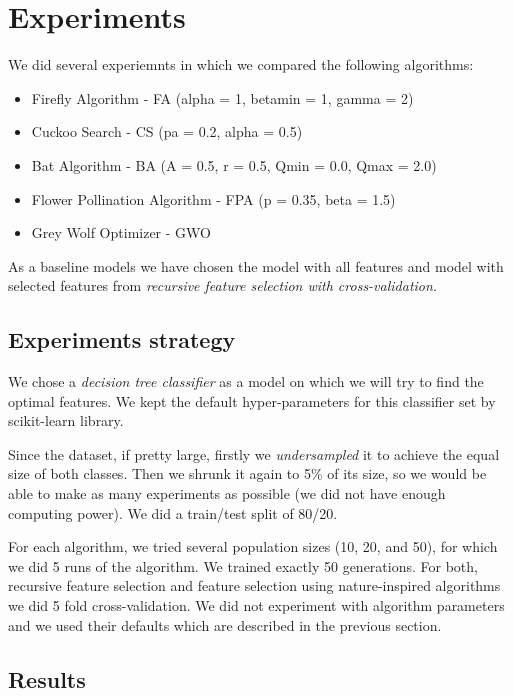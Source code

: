 \documentclass[runningheads]{llncs}
\begin{document}
\section{Experiments}

We did several experiemnts in which we compared the following algorithms:

\begin{itemize}
	\item Firefly Algorithm \cite{fister2013comprehensive} - FA (alpha = 1, betamin = 1, gamma = 2)
	\item Cuckoo Search \cite{yang2009cuckoo} - CS (pa = 0.2, alpha = 0.5)
	\item Bat Algorithm \cite{yang2010new} - BA (A = 0.5, r = 0.5, Qmin = 0.0, Qmax = 2.0)
	\item Flower Pollination Algorithm \cite{yang2012flower} - FPA (p = 0.35, beta = 1.5)
	\item Grey Wolf Optimizer \cite{Mirjalili_Mirjalili_Lewis_2014} - GWO
\end{itemize}

As a baseline models we have chosen the model with all features and model with selected features from \textit{recursive feature selection with cross-validation}.

\subsection{Experiments strategy}

We chose a \textit{decision tree classifier} as a model on which we will try to find the optimal features. We kept the default hyper-parameters for this classifier set by scikit-learn library.

Since the dataset, if pretty large, firstly we \textit{undersampled} it to achieve the equal size of both classes. Then we shrunk it again to 5\% of its size, so we would be able to make as many experiments as possible (we did not have enough computing power). We did a train/test split of 80/20.

For each algorithm, we tried several population sizes (10, 20, and 50), for which we did 5 runs of the algorithm. We trained exactly 50 generations. For both, recursive feature selection and feature selection using nature-inspired algorithms we did 5 fold cross-validation. We did not experiment with algorithm parameters and we used their defaults which are described in the previous section.

\subsection{Results}
\end{document}
